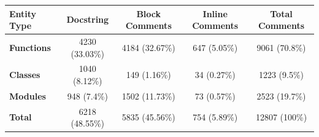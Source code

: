 \begin{tabular}{lcccc}
\hline
\textbf{Entity Type} & \textbf{Docstring} & \textbf{Block Comments} & \textbf{Inline Comments} & \textbf{Total Comments} \\
\hline
\textbf{Functions} & 4230 (33.03\%) & 4184 (32.67\%) & 647 (5.05\%) & 9061 (70.8\%) \\

\textbf{Classes} & 1040 (8.12\%) & 149 (1.16\%) & 34 (0.27\%) & 1223 (9.5\%) \\

\textbf{Modules} & 948 (7.4\%) & 1502 (11.73\%) & 73 (0.57\%) & 2523 (19.7\%) \\

\textbf{Total} & 6218 (48.55\%) & 5835 (45.56\%) & 754 (5.89\%) & 12807 (100\%) \\
\hline
\end{tabular}
